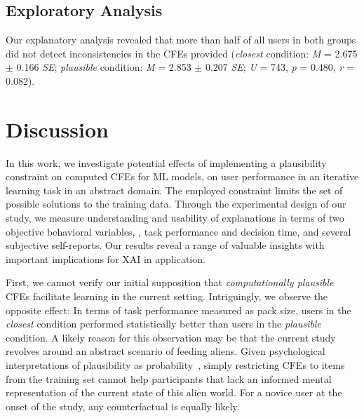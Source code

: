 \subsection{Exploratory Analysis}
Our explanatory analysis revealed that more than half of all users in both groups did not detect inconsistencies in the \glspl{CFE} provided (\textit{closest} condition: \textit{M} = 2.675 $\pm$ 0.166 \textit{SE}; \textit{plausible} condition: \textit{M} = 2.853 $\pm$ 0.207 \textit{SE}; \textit{U} = 743, \textit{p} = 0.480, \textit{r} = 0.082).

\section{Discussion}\label{sec:discussion}

In this work, we investigate potential effects of implementing a plausibility constraint on computed \glspl{CFE} for \gls{ML} models, on user performance in an iterative learning task in an abstract domain. 
The employed constraint limits the set of possible solutions to the training data.
Through the experimental design of our study, we measure understanding and usability of explanations in terms of two objective behavioral variables, \ie, task performance and decision time, and several subjective self-reports. 
Our results reveal a range of valuable insights with important implications for \gls{XAI} in application.

First, we cannot verify our initial supposition that \textit{computationally plausible} \glspl{CFE} facilitate learning in the current setting. 
Intriguingly, we observe the opposite effect: In terms of task performance measured as pack size, users in the \textit{closest} condition performed statistically better than users in the \textit{plausible} condition.
A likely reason for this observation may be that the current study revolves around an abstract scenario of feeding aliens. 
Given psychological interpretations of plausibility as probability~\citep{pezdek_is_2006, de_brigard_remembering_2013}, simply restricting \glspl{CFE} to items from the training set cannot help participants that lack an informed mental representation of the current state of this alien world. 
For a novice user at the onset of the study, any counterfactual is equally likely.

